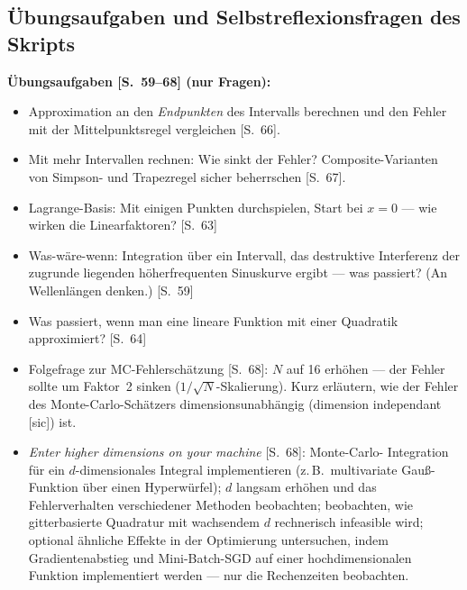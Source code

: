 \subsection{Übungsaufgaben und Selbstreflexionsfragen des Skripts}

\textbf{Übungsaufgaben [S.~59--68] (nur Fragen):}
\begin{itemize}[itemsep=2pt]
  \item Approximation an den \emph{Endpunkten} des Intervalls berechnen und den
        Fehler mit der Mittelpunktsregel vergleichen [S.~66].
  \item Mit mehr Intervallen rechnen: Wie sinkt der Fehler? Composite-Varianten von
        Simpson- und Trapezregel sicher beherrschen [S.~67].
  \item Lagrange-Basis: Mit einigen Punkten durchspielen, Start bei $x = 0$ ---
        wie wirken die Linearfaktoren? [S.~63]
  \item Was-wäre-wenn: Integration über ein Intervall, das destruktive Interferenz
        der zugrunde liegenden höherfrequenten Sinuskurve ergibt --- was passiert?
        (An Wellenlängen denken.) [S.~59]
  \item Was passiert, wenn man eine lineare Funktion mit einer Quadratik
        approximiert? [S.~64]
  \item Folgefrage zur MC-Fehlerschätzung [S.~68]: $N$ auf 16 erhöhen --- der Fehler
        sollte um Faktor~2 sinken ($1/\sqrt{N}$-Skalierung). Kurz erläutern, wie der
        Fehler des Monte-Carlo-Schätzers dimensionsunabhängig (dimension independant
        [sic]) ist.
  \item \emph{Enter higher dimensions on your machine} [S.~68]: Monte-Carlo-
        Integration für ein $d$-dimensionales Integral implementieren (z.\,B.\
        multivariate Gau{\ss}-Funktion über einen Hyperwürfel); $d$ langsam erhöhen
        und das Fehlerverhalten verschiedener Methoden beobachten; beobachten, wie
        gitterbasierte Quadratur mit wachsendem $d$ rechnerisch infeasible wird;
        optional ähnliche Effekte in der Optimierung untersuchen, indem
        Gradientenabstieg und Mini-Batch-SGD auf einer hochdimensionalen Funktion
        implementiert werden --- nur die Rechenzeiten beobachten.
\end{itemize}

